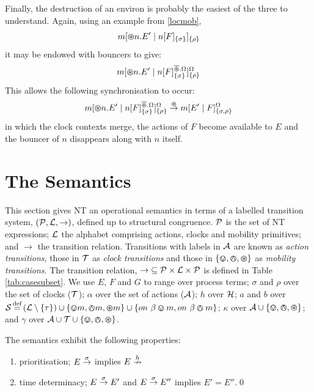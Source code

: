 Finally, the destruction of an environ is probably the easiest of the
three to understand.  Again, using an example from \ref{locmob},
\begin{equation}
{m}[ \varoast n.E^\prime\;|\;{n}[ F ]_{\{\sigma\}} ]_{\{\rho\}}
\end{equation}
it may be endowed with bouncers to give:
\begin{equation}
{m}[ \varoast n.E^\prime \;|\; {n}[ F ]^{\overline{\varoast}.\Omega}_{\{\sigma\}} ]^{\Omega}_{\{\rho\}}
\end{equation}
This allows the following synchronisation to occur:
\begin{equation}
{m}[ \varoast n.E^\prime \;|\; {n}[ F ]^{\overline{\varoast}.\Omega}_{\{\sigma\}} ]^{\Omega}_{\{\rho\}}
\stackrel{\varoast}{\rightarrow}
{m}[ E^\prime \;|\; {F} ]^{\Omega}_{\{\sigma, \rho\}}
\end{equation}
in which the clock contexts merge, the actions of $F$ become
available to $E$ and the bouncer of $n$ disappears along with $n$
itself.

\section{The Semantics}
\label{ntsemantics}

This section gives NT an operational semantics in terms of a labelled
transition system, $(\text{$\mathcal{P}$}, \text{$\mathcal{L}$}, \rightarrow)$, defined
up to structural congruence.  $\text{$\mathcal{P}$}$ is the set of NT expressions; $\text{$\mathcal{L}$}$ the
alphabet comprising actions, clocks and mobility primitives; and $\rightarrow$ the
transition relation.  Transitions with labels in
$\text{$\mathcal{A}$}$ are known as \emph{action transitions}, those in $\text{$\mathcal{T}$}$ as
\emph{clock transitions} and those in $\text{$\{ \varovee, \varowedge , \varoast\}$}$ as \emph{mobility
transitions}.  The transition relation, $\mathop{\rightarrow} \mathrel{\subseteq}
\text{$\mathcal{P}$} \times \text{$\mathcal{L}$} \times \text{$\mathcal{P}$}$ is defined in Table \ref{tab:casesubset}.
We use $E$, $F$ and $G$ to range over process terms; $\sigma$ and $\rho$ over the
set of clocks ($\text{$\mathcal{T}$}$); $\alpha$ over the set of actions
($\text{$\mathcal{A}$}$); $h$ over $\text{$\mathcal{H}$}$; $a$ and $b$ over 
$\text{$\mathcal{S}$} \operatorname{\stackrel{\textrm{def}}{=}}
\left(\text{$\mathcal{L}$} \setminus \{\tau\}\right) 
\cup 
\{ \varovee m, \varowedge m, \varoast m \} 
\cup
\{ on\ \beta \varovee m, on\ \beta \varowedge m \}
$;
$\kappa$ over $\text{$\mathcal{A}$} \cup \text{$\{ \varovee, \varowedge , \varoast\}$}$;
and $\gamma$ over $\text{$\mathcal{A}$} \cup \text{$\mathcal{T}$} \cup \text{$\{ \varovee, \varowedge , \varoast\}$}$.

\begin{proposition}
The semantics exhibit the following properties:
\begin{enumerate}
\item prioritisation;
$E \stackrel{\sigma}{\rightarrow}$ implies $E \stackrel{h}{\nrightarrow}$ 
\item time determinacy; $E \stackrel{\sigma}{\rightarrow} E'$ and $E
\stackrel{\sigma}{\rightarrow} E''$ implies $E' = E''$.\qed
\end{enumerate}
\end{proposition}

